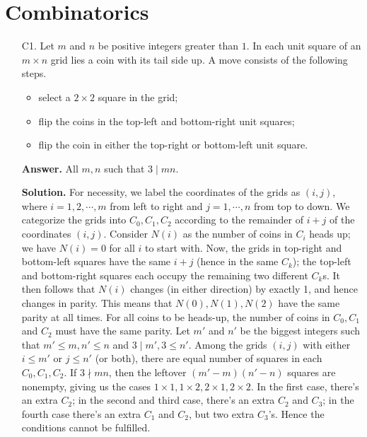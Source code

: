 \documentclass[11pt,a4paper]{article}
\begin{document}
    \section*{Combinatorics}
    \begin{enumerate}
    	\item [C1.] 
    	Let $m$ and $n$ be positive integers greater than $1$. In each unit square of an $m\times n$ grid lies a coin with its tail side up. A move consists of the following steps.
    	\begin{itemize}
    		\item select a $2\times 2$ square in the grid;
    		\item flip the coins in the top-left and bottom-right unit squares;
    		\item flip the coin in either the top-right or bottom-left unit square.
    	\end{itemize}
    	
    	
    	\textbf{Answer.} 
    	All $m, n$ such that $3\mid mn$. 
    	
    	\textbf{Solution.}
    	For necessity, we label the coordinates of the grids as $(i, j)$, 
    	where $i=1,2, \cdots, m$ from left to right and $j=1, \cdots, n$ from top to down. 
    	We categorize the grids into $C_0, C_1, C_2$ according to the remainder of $i + j$ of the coordinates $(i, j)$. 
    	Consider $N(i)$ as the number of coins in $C_i$ heads up; 
    	we have $N(i)=0$ for all $i$ to start with. 
    	Now, the grids in top-right and bottom-left squares have the same $i + j$ 
    	(hence in the same $C_k$); 
    	the top-left and bottom-right squares each occupy the remaining two different $C_k$s. 
    	It then follows that $N(i)$ changes (in either direction) by exactly 1, 
    	and hence changes in parity. 
    	This means that $N(0), N(1), N(2)$ have the same parity at all times. 
    	For all coins to be heads-up, 
    	the number of coins in $C_0, C_1$ and $C_2$ must have the same parity. 
    	Let $m'$ and $n'$ be the biggest integers such that 
    	$m'\le m, n'\le n$ and $3\mid m', 3\le n'$. 
    	Among the grids $(i, j)$ with either $i\le m'$ or $j\le n'$ (or both), 
    	there are equal number of squares in each $C_0, C_1, C_2$. 
    	If $3\nmid mn$, 
    	then the leftover $(m'-m)(n'-n)$ squares are nonempty, 
    	giving us the cases 
    	$1\times 1, 1\times 2, 2\times 1, 2\times 2$. 
    	In the first case, 
    	there's an extra $C_2$; 
    	in the second and third case, 
    	there's an extra $C_2$ and $C_3$; 
    	in the fourth case there's an extra $C_1$ and $C_2$, but two extra $C_3$'s. 
    	Hence the conditions cannot be fulfilled. 
    	

\end{enumerate}
\end{document}
